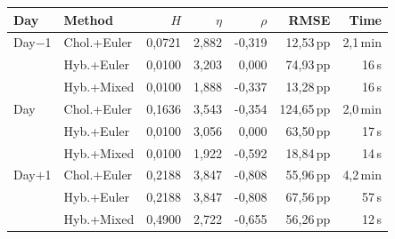\begin{tabular}{l l r r r r r}
  \toprule
  \textbf{Day} & \textbf{Method} & \textbf{$H$} & \textbf{$\eta$} & \textbf{$\rho$} & \textbf{RMSE} & \textbf{Time} \\
  \midrule
  Day$-$1 & Chol.+Euler & 0,0721 & 2,882 & -0,319 & 12,53\,pp & 2,1\,min \\
   & Hyb.+Euler & 0,0100 & 3,203 & 0,000 & 74,93\,pp & 16\,s \\
   & Hyb.+Mixed & 0,0100 & 1,888 & -0,337 & 13,28\,pp & 16\,s \\
  \addlinespace[3pt]
  Day & Chol.+Euler & 0,1636 & 3,543 & -0,354 & 124,65\,pp & 2,0\,min \\
   & Hyb.+Euler & 0,0100 & 3,056 & 0,000 & 63,50\,pp & 17\,s \\
   & Hyb.+Mixed & 0,0100 & 1,922 & -0,592 & 18,84\,pp & 14\,s \\
  \addlinespace[3pt]
  Day$+$1 & Chol.+Euler & 0,2188 & 3,847 & -0,808 & 55,96\,pp & 4,2\,min \\
   & Hyb.+Euler & 0,2188 & 3,847 & -0,808 & 67,56\,pp & 57\,s \\
   & Hyb.+Mixed & 0,4900 & 2,722 & -0,655 & 56,26\,pp & 12\,s \\
  \bottomrule
\end{tabular}